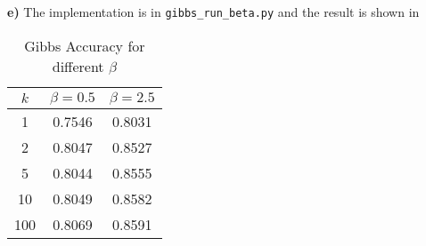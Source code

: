 \documentclass{article}
\begin{document}
\textbf{e)}
The implementation is in \texttt{gibbs\_run\_beta.py} and the result is shown in 

\begin{table}
\centering
\begin{tabular}{c|c|c}
\textbf{$k$} & \textbf{$\beta = 0.5$} & \textbf{$\beta=2.5$} \\\hline
1 & 0.7546 & 0.8031 \\\hline
2 & 0.8047 & 0.8527\\\hline
5 & 0.8044 & 0.8555 \\\hline
10 & 0.8049 & 0.8582 \\\hline
100 & 0.8069 & 0.8591 \\\hline
\end{tabular}
\caption{Gibbs Accuracy for different $\beta$}
\label{tab:gibbsbeta}
\end{table}
\end{document}
